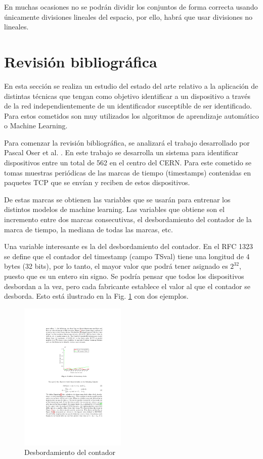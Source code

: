 En muchas ocasiones no se podrán dividir los conjuntos de forma correcta usando únicamente divisiones lineales del espacio, por ello, habrá que usar divisiones no lineales.

\section{Revisión bibliográfica}

En esta sección se realiza un estudio del estado del arte relativo a la aplicación de distintas técnicas que tengan como objetivo identificar a un dispositivo a través de la red independientemente de un identificador susceptible de ser identificado. Para estos cometidos son muy utilizados los algoritmos de aprendizaje automático o Machine Learning. 

Para comenzar la revisión bibliográfica, se analizará el trabajo desarrollado por Pascal Oser et al. \cite{oser2018identifying}. En este trabajo se desarrolla un sistema para identificar dispositivos entre un total de 562 en el centro del CERN. Para este cometido se tomas muestras periódicas de las marcas de tiempo (timestamps) contenidas en paquetes TCP que se envían y reciben de estos dispositivos.

De estas marcas se obtienen las variables que se usarán para entrenar los distintos modelos de machine learning. Las variables que obtiene son el incremento entre dos marcas consecutivas, el desbordamiento del contador de la marca de tiempo, la mediana de todas las marcas, etc.

Una variable interesante es la del desbordamiento del contador. En el RFC 1323 \cite{RFC1323} se define que el contador del timestamp (campo TSval) tiene una longitud de 4 bytes (32 bits), por lo tanto, el mayor valor que podrá tener asignado es $2^{32}$, puesto que es un entero sin signo. Se podría pensar que todos los dispositivos desbordan a la vez, pero cada fabricante establece el valor al que el contador se desborda. Esto está ilustrado en la Fig. \ref{fig:cern_ts_overflow} con dos ejemplos.

\begin{figure}[htpb!]
    \centering
    \includegraphics[width=0.45\textwidth]{images/CERN-timestamp_overflow}
    \caption{Desbordamiento del contador \cite{oser2018identifying}}
    \label{fig:cern_ts_overflow}
\end{figure}

